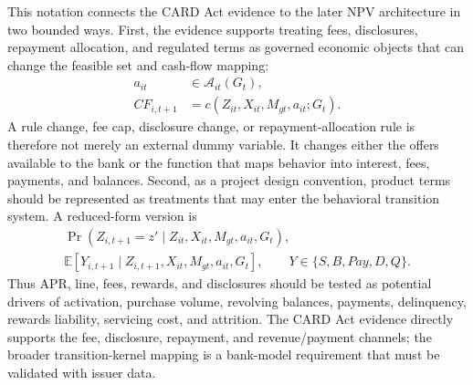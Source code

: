 \documentclass[11pt]{article}
\newcommand{\E}{\mathbb{E}}
\newcommand{\1}{\mathbf{1}}
\begin{document}
This notation connects the CARD Act evidence to the later NPV architecture in
two bounded ways. First, the evidence supports treating fees, disclosures,
repayment allocation, and regulated terms as governed economic objects that
can change the feasible set and cash-flow mapping:
\begin{align}
  a_{it} &\in \mathcal{A}_{it}(G_t), \label{eq:regulated-action-set}\\
  CF_{i,t+1} &= c(Z_{it},X_{it},M_{gt},a_{it};G_t).
       \label{eq:regulated-cashflow-map}
\end{align}
A rule change, fee cap, disclosure change, or repayment-allocation rule is
therefore not merely an external dummy variable. It changes either the offers
available to the bank or the function that maps behavior into interest, fees,
payments, and balances. Second, as a project design convention, product terms
should be represented as treatments that may enter the behavioral transition
system. A reduced-form version is
\begin{align}
  \Pr(Z_{i,t+1}=z'\mid Z_{it},X_{it},M_{gt},a_{it},G_t),
       \label{eq:terms-transition}\\
  \E[Y_{i,t+1}\mid Z_{i,t+1},X_{it},M_{gt},a_{it},G_t],
       \qquad
  Y\in\{S,B,Pay,D,Q\}.
       \label{eq:terms-outcomes}
\end{align}
Thus APR, line, fees, rewards, and disclosures should be tested as potential
drivers of activation, purchase volume, revolving balances, payments,
delinquency, rewards liability, servicing cost, and attrition. The CARD Act
evidence directly supports the fee, disclosure, repayment, and revenue/payment
channels; the broader transition-kernel mapping is a bank-model requirement
that must be validated with issuer data.
\end{document}
